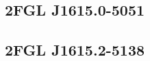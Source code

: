 \documentclass[12pt,preprint]{aastex}
\newcommand{\gev}{\text{GeV}\xspace}
\newcommand{\tsext}{{\ensuremath{\text{TS}_\text{ext}}}\xspace}
\newcommand{\tsinc}{\ensuremath{\text{TS}_\text{inc}}\xspace}
\renewcommand{\deg}{\ensuremath{^\circ}\xspace}
\begin{document}
\subsection{2FGL J1615.0-5051}
\label{section_2FGL_J1615.0-5051}




\subsection{2FGL J1615.2-5138}
\label{section_2FGL_J1615.2-5138}






\end{document}
